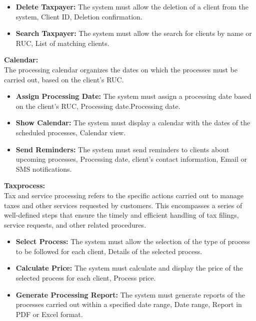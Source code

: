 \documentclass[12pt,a4paper, twosite]{article}
\begin{document}
\begin{itemize}
\item \textbf {Delete Taxpayer:}
The system must allow the deletion of a client from the system, Client ID, Deletion confirmation.
\end{itemize}

\begin{itemize}
\item \textbf {Search Taxpayer:}
The system must allow the search for clients by name or RUC, List of matching clients. 
\end{itemize}

\textbf{Calendar:}\\
The processing calendar organizes the dates on which the processes must be carried out, based on the client's RUC.
\begin{itemize}
\item \textbf {Assign Processing Date:}
The system must assign a processing date based on the client's RUC, Processing date.Processing date.
\end{itemize}
\begin{itemize}
\item \textbf {Show Calendar:}
The system must display a calendar with the dates of the scheduled processes, Calendar view.
\end{itemize}
\begin{itemize}
\item \textbf {Send Reminders:}
The system must send reminders to clients about upcoming processes, Processing date, client's contact information, Email or SMS notifications.
\end{itemize}

\textbf{Taxprocess:}\\
Tax and service processing refers to the specific actions carried out to manage taxes and other services requested by customers. This encompasses a series of well-defined steps that ensure the timely and efficient handling of tax filings, service requests, and other related procedures.
\begin{itemize}
\item \textbf {Select Process:}
The system must allow the selection of the type of process to be followed for each client, Details of the selected process.
\end{itemize}
\begin{itemize}
\item \textbf {Calculate Price:}
The system must calculate and display the price of the selected process for each client, Process price.
\end{itemize}
\begin{itemize}
\item \textbf {Generate Processing Report:}
The system must generate reports of the processes carried out within a specified date range, Date range, Report in PDF or Excel format.
\end{itemize}
\end{document}
